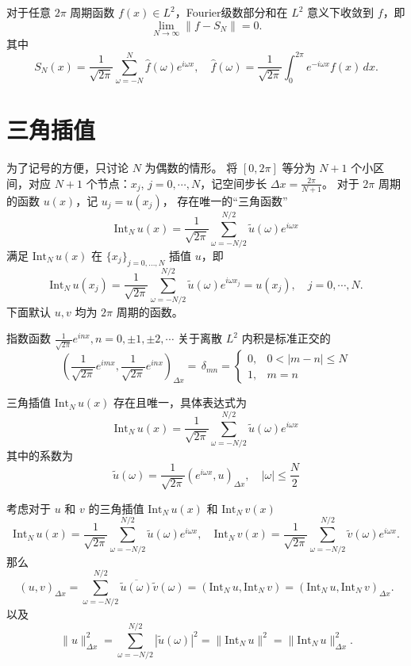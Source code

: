 \begin{theorem}
    对于任意 $2\pi$ 周期函数 $f(x) \in L^2$，Fourier级数部分和在 $L^2$ 意义下收敛到 $f$，即
    \[
        \lim_{N \to \infty} \|f - S_N\| = 0.
    \]
    其中
    \[
        S_N(x) = \frac{1}{\sqrt{2\pi}} \sum_{\omega = -N}^N \hat{f}(\omega) e^{i \omega x},\quad
        \hat{f}(\omega) = \frac{1}{\sqrt{2\pi}} \int_0^{2\pi} e^{-i \omega x}f(x)\,dx.
    \]
\end{theorem}


\section{三角插值}

 {\color{blue}为了记号的方便，只讨论 $N$ 为偶数的情形。} 将 $[0,2\pi]$ 等分为 $N+1$ 个小区间，对应 $N+1$ 个节点：$x_j$, $j = 0,\cdots,N$，记空间步长 $\Delta x = \frac{2\pi}{N+1}$。
对于 $2\pi$ 周期的函数 $u(x)$，记 $u_j = u(x_j)$，
存在唯一的“三角函数”
\[
    \text{Int}_N\,u(x) = \frac{1}{\sqrt{2\pi}} \sum_{\omega = -N/2}^{N/2} \widetilde{u}(\omega) e^{i \omega x}
\]
满足 $\text{Int}_N\,u(x)$ 在 $\{x_j\}_{j=0,\dots,N}$ 插值 $u$，即
\[
    \text{Int}_N\,u(x_j) = \frac{1}{\sqrt{2\pi}} \sum_{\omega = -N/2}^{N/2} \widetilde{u}(\omega) e^{i \omega x_j} = u(x_j),\quad
    j=0,\cdots,N.
\]
下面默认 $u,v$ 均为 $2\pi$ 周期的函数。

\begin{lemma}
    指数函数 $\frac{1}{\sqrt{2\pi}} e^{i n x},n=0,\pm 1,\pm 2,\cdots$
    关于离散 $L^2$ 内积是标准正交的
    \[
        \left(\frac{1}{\sqrt{2\pi}} e^{i m x},\frac{1}{\sqrt{2\pi}} e^{i n x}\right)_{\Delta x}
        =\, \delta_{mn} =
        \begin{cases}
            0, & 0 < |m-n| \le N \\
            1, & m = n
        \end{cases}
    \]
\end{lemma}


\begin{theorem}
    三角插值 $\text{Int}_N\,u(x)$ 存在且唯一，具体表达式为
    \[
        \text{Int}_N\,u(x) = \frac{1}{\sqrt{2\pi}} \sum_{\omega = -N/2}^{N/2} \widetilde{u}(\omega) e^{i \omega x}
    \]
    其中的系数为
    \[
        \widetilde{u}(\omega) = \frac{1}{\sqrt{2\pi}}(e^{i \omega x},u)_{\Delta x},\quad
        |\omega| \le \frac{N}{2}
    \]
\end{theorem}


\begin{theorem}
    考虑对于 $u$ 和 $v$ 的三角插值 $\text{Int}_N\,u(x)$ 和 $\text{Int}_N\,v(x)$
    \[
        \text{Int}_N\,u(x) = \frac{1}{\sqrt{2\pi}} \sum_{\omega = -N/2}^{N/2} \widetilde{u}(\omega) e^{i \omega x},\quad
        \text{Int}_N\,v(x) = \frac{1}{\sqrt{2\pi}} \sum_{\omega = -N/2}^{N/2} \widetilde{v}(\omega) e^{i \omega x}.
    \]
    那么
    \[
        (u,v)_{\Delta x} = \sum_{\omega = -N/2}^{N/2} \overline{\widetilde{u}(\omega)} \widetilde{v}(\omega) = (\text{Int}_N\,u,\text{Int}_N\,v) = (\text{Int}_N\,u,\text{Int}_N\,v)_{\Delta x}.
    \]
    以及
    \[
        \|u\|_{\Delta x}^2 = \sum_{\omega = -N/2}^{N/2} |\widetilde{u}(\omega)|^2 = \|\text{Int}_N\,u\|^2 = \|\text{Int}_N\,u\|_{\Delta x}^2.
    \]
\end{theorem}


